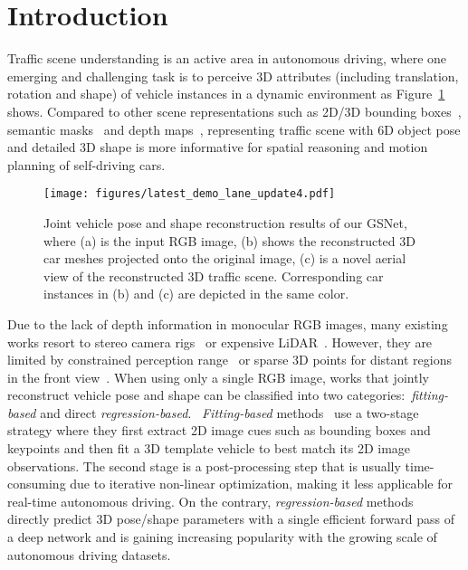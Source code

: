\documentclass[runningheads]{llncs}
\begin{document}
\section{Introduction}
Traffic scene understanding is an active area in autonomous driving, where one emerging and challenging task is to perceive 3D attributes (including translation, rotation and shape) of vehicle instances in a dynamic environment as Figure~\ref{fig:example1} shows. Compared to other scene representations such as 2D/3D bounding boxes~\cite{chen2016monocular,li2019stereo,mousavian20173d}, semantic masks~\cite{cordts2016cityscapes,pohlen2017full} and depth maps~\cite{xu2018multi}, representing traffic scene with 6D object pose and detailed 3D shape is more informative for spatial reasoning and motion planning of self-driving cars.

\begin{figure}[!t]
	\centering
\texttt{[image: figures/latest\_demo\_lane\_update4.pdf]}
	\caption{Joint vehicle pose and shape reconstruction results of our GSNet, where (a) is the input RGB image, (b) shows the reconstructed 3D car meshes projected onto the original image, (c) is a novel aerial view of the reconstructed 3D traffic scene. Corresponding car instances in (b) and (c) are depicted in the same color.}
\label{fig:example1}
\end{figure}

Due to the lack of depth information in monocular RGB images, many existing works resort to stereo camera rigs~\cite{li2019stereo,li2018stereo} or expensive LiDAR~\cite{yang2018pixor,yang2019std,ku2019monocular}.
However, they are limited by constrained perception range~\cite{li2019stereo} or sparse 3D points for distant regions in the front view~\cite{song2019apollocar3d}. When using only a single RGB image, works that jointly reconstruct vehicle pose and shape can be classified into two categories:~\textit{fitting-based} and direct \textit{regression-based}.
~\textit{Fitting-based} methods~\cite{chabot2017deep,su2015render,song2019apollocar3d} use a two-stage strategy where they first extract 2D image cues such as bounding boxes and keypoints and then fit a 3D template vehicle to best match its 2D image observations. The second stage is a post-processing step that is usually time-consuming due to iterative non-linear optimization, making it less applicable for real-time autonomous driving. On the contrary, \textit{regression-based} methods~\cite{kundu20183d,song2019apollocar3d} directly predict 3D pose/shape parameters with a single efficient forward pass of a deep network and is gaining increasing popularity with the growing scale of autonomous driving datasets.
\end{document}
